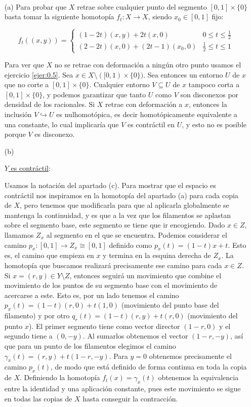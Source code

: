 \documentclass[twoside]{article}
\begin{document}
\begin{solucion}\
\begin{enumerate}
\item[(a)] Para probar que $X$ retrae sobre cualquier punto del segmento $[0,1]\times\{0\}$ basta tomar la siguiente homotopía $f_t:X\to X$, siendo $x_0\in [0,1]$ fijo:

\[
f_t((x,y))=\begin{cases}
(1-2t)(x,y)+2t(x,0) & 0\leq t\leq \frac{1}{2}\\
(2-2t)(x,0)+(2t-1)(x_0,0) & \frac{1}{2}\leq t\leq 1
\end{cases}
\]

Para ver que $X$ no se retrae con deformación a ningún otro punto usamos el ejercicio \ref{ejer:0.5}. Sea $x\in X\setminus([0,1)\times\{0\})$. Sea entonces un entorno $U$ de $x$ que no corte a $[0,1]\times\{0\}$. Cualquier entorno $V\subseteq U$ de $x$ tampoco corta a $[0,1]\times\{0\}$, y podemos garantizar que tanto $U$ como $V$ son disconexos por densidad de los racionales. Si $X$ retrae con deformación a $x$, entonces la inclusión $V\hookrightarrow U$ es nulhomotópica, es decir homotópicamente equivalente a una constante, lo cual implicaría que $V$ es contráctil en $U$, y esto no es posible porque $V$ es disconexo. 

\item[(b)] 

\underline{$Y$ es contráctil}:

Usamos la notación del apartado (c). Para mostrar que el espacio es contráctil nos inspiramos en la homotopía del apartado (a) para cada copia de $X$, pero tenemos que modificarla para que al aplicarla globalmente se mantenga la continuidad, y es que a la vez que los filamentos se aplastan sobre el segmento base, este segmento se tiene que ir encogiendo. Dado $x\in Z$, llamamos $Z_x$ al segmento en el que se encuentra. Podemos considerar el camino $p_x:[0,1]\to Z_x\cong[0,1]$ definido como $p_x(t)=(1-t)x+t$. Esto es, el camino que empieza en $x$ y termina en la esquina derecha de $Z_x$. La homotopía que buscamos realizará precisamente ese camino para cada $x\in Z$. Si $x=(r,y)\in Y\setminus Z$, entonces seguirá un movimiento que combine el movimiento de los puntos de su segmento base con el movimiento de acercarse a este. Esto es, por un lado tenemos el camino $p_x(t)=(1-t)(r,0)+t(1,0)$ (movimiento del punto base del filamento) y por otro $q_r(t)=(1-t)(r,y)+t(r,0)$ (movimiento del punto $x$). El primer segmento tiene como vector director $(1-r,0)$ y el segundo tiene a $(0,-y)$. Al sumarlos obtenemos el vector $(1-r,-y)$, así que para un punto de los filamentos elegimos el camino $\gamma_x(t)=(r,y)+t(1-r,-y)$. Para $y=0$ obtenemos precisamente el camino $p_x(t)$, de modo que está definido de forma continua en toda la copia de $X$. Definiendo la homotopía $f_t(x)=\gamma_x(t)$ obtenemos la equivalencia entre la identidad y una aplicación constante, pues este movimiento se sigue en todas las copias de $X$ hasta conseguir la contracción. 


\end{enumerate}
\end{solucion}
\end{document}
